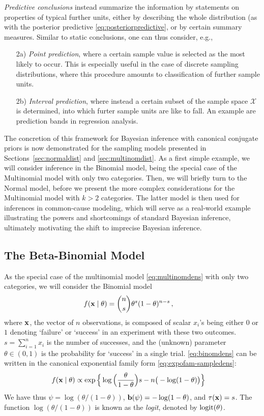 \emph{Predictive conclusions} instead summarize the information by statements on properties of typical further units,
either by describing the whole distribution (as with the posterior predictive \eqref{eq:posteriorpredictive},
or by certain summary measures.
Similar to static conclusions, one can thus consider, e.g.,
\begin{enumerate}
\item[2a)] \emph{Point prediction},
where a certain sample value is selected as the most likely to occur.
This is especially useful in the case of discrete sampling distributions,
where this procedure amounts to classification of further sample units.
\item[2b)] \emph{Interval prediction},
where instead a certain subset of the sample space $\mathcal{X}$ is determined,
into which furter sample units are like to fall.
An example are prediction bands in regression analysis.
\end{enumerate}

The concretion of this framework for Bayesian inference with canonical conjugate priors
is now demonstrated for the sampling models presented in Sections~\ref{sec:normaldist} and \ref{sec:multinomdist}.
As a first simple example, we will consider inference in the Binomial model,
being the special case of the Multinomial model with only two categories.
Then, we will briefly turn to the Normal model,
before we present the more complex considerations for the Multinomial model with $k>2$ categories.
The latter model %
is then used for inferences in common-cause modeling,
which will serve as a real-world example illustrating the powers and shortcomings of standard Bayesian inference,
ultimately motivating the shift to imprecise Bayesian inference.


\subsection{The Beta-Binomial Model}
\label{sec:beta-binom}

As the special case of the multinomial model \eqref{eq:multinomdens} with only two categories, we will consider the Binomial model
\begin{align}
\label{eq:binomdens}
f(\mathbf{x}\mid\theta) &= {n \choose s}\theta^s (1-\theta)^{n-s}\,,
\end{align}
where $\mathbf{x}$, the vector of $n$ observations, is composed of scalar $x_i$'s being either $0$ or $1$
denoting `failure' or `success' in an experiment with these two outcomes.
$s = \sum_{i=1}^n x_i$ is the number of successes,
and the (unknown) parameter $\theta \in (0,1)$ is the probability for `success' in a single trial.
\eqref{eq:binomdens} can be written in the canonical exponential family form \eqref{eq:expofam-sampledens}:
\begin{align*}
f(\mathbf{x}\mid\theta) &\propto \exp\Big\{ \log\Big(\frac{\theta}{1-\theta}\Big) s - n \big(-\log(1-\theta)\big) \Big\}
\end{align*}
We have thus $\psi = \log(\theta/(1-\theta))$, $\mathbf{b}(\psi) = -\log(1-\theta)$, and $\tau(\mathbf{x}) = s$.
The function $\log(\theta/(1-\theta))$ is known as the \emph{logit}, denoted by $\operatorname{logit}(\theta)$.

